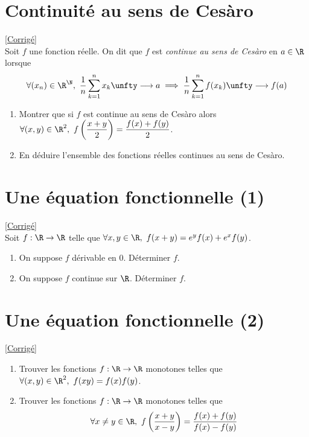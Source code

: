 \documentclass{book}
\begin{document}
	\section{Continuité au sens de Cesàro }
	\textcolor{blue}{\hyperref[Continuité au sens de Cesàro corrigé]{[Corrigé]}}\\
	\label{Continuité au sens de Cesàro}
	Soit $f$ une fonction réelle. On dit que $f$ est \textit{continue au sens de Cesàro} en $a\in \R$ lorsque $$\forall (x_n)\in \R^\N,\ \displaystyle\frac{1}{n}\sum_{k=1}^nx_k\unfty\longrightarrow a\implies \frac{1}{n}\sum_{k=1}^nf(x_k)\unfty\longrightarrow f(a)$$
	\begin{enumerate}
		\item Montrer que si $f$ est continue au sens de Cesàro alors $\forall (x,y)\in \R^2,\ f\left(\dfrac{x+y}{2}\right)=\dfrac{f(x)+f(y)}{2}$.
		\item En déduire l'ensemble des fonctions réelles continues au sens de Cesàro.
	\end{enumerate}
	
	\section{Une équation fonctionnelle (1) }
	\textcolor{blue}{\hyperref[Une équation fonctionnelle (1) corrigé]{[Corrigé]}}\\
	\label{Une équation fonctionnelle (1)}
	Soit $f:\R\to \R$ telle que $\forall x,y\in \R,\ f(x+y)=e^yf(x)+e^xf(y)$.
	\begin{enumerate}
		\item On suppose $f$ dérivable en $0$. Déterminer $f$.
		\item On suppose $f$ continue sur $\R$. Déterminer $f$.
	\end{enumerate}
	
	\section{Une équation fonctionnelle (2)}
	\textcolor{blue}{\hyperref[Une équation fonctionnelle (2) corrigé]{[Corrigé]}}\\
	\label{Une équation fonctionnelle (2)}
	\begin{enumerate}
		\item Trouver les fonctions $f:\R\to \R$ monotones telles que $\forall (x,y)\in \R^2,\ f(xy)=f(x)f(y)$.
		\item Trouver les fonctions $f:\R\to \R$ monotones telles que
		$$\forall x\ne y\in \R,\ f\left(\frac{x+y}{x-y}\right)=\frac{f(x)+f(y)}{f(x)-f(y)}$$
	\end{enumerate}
	
\end{document}

